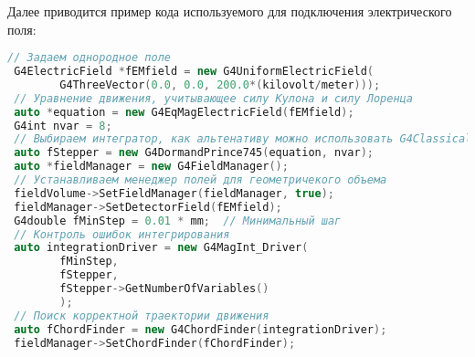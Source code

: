 Далее приводится пример кода используемого для подключения электрического поля:
\begin{lstlisting}[language=C++]
 // Задаем однородное поле
 G4ElectricField *fEMfield = new G4UniformElectricField(
        G4ThreeVector(0.0, 0.0, 200.0*(kilovolt/meter)));
 // Уравнение движения, учитывающее силу Кулона и силу Лоренца
 auto *equation = new G4EqMagElectricField(fEMfield);
 G4int nvar = 8;
 // Выбираем интегратор, как альтенативу можно использовать G4ClassicalRK4
 auto fStepper = new G4DormandPrince745(equation, nvar);
 auto *fieldManager = new G4FieldManager();
 // Устанавливаем менеджер полей для геометричекого объема
 fieldVolume->SetFieldManager(fieldManager, true); 
 fieldManager->SetDetectorField(fEMfield);
 G4double fMinStep = 0.01 * mm;  // Минимальный шаг
 // Контроль ошибок интегрирования
 auto integrationDriver = new G4MagInt_Driver(
        fMinStep,
        fStepper,
        fStepper->GetNumberOfVariables()
        );
 // Поиск корректной траектории движения
 auto fChordFinder = new G4ChordFinder(integrationDriver);
 fieldManager->SetChordFinder(fChordFinder);
\end{lstlisting}
